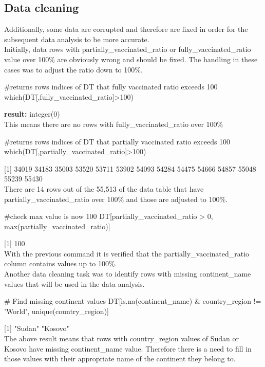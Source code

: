 \subsection{Data cleaning}
Additionally, some data are corrupted and therefore are fixed in order for the subsequent data analysis to be more accurate. \\
Initially, data rows with partially\_vaccinated\_ratio or fully\_vaccinated\_ratio value over 100\% are obviously wrong and should be fixed. The handling in these cases was to adjust the ratio down to 100\%. 

\begin{Rcode}{\scriptsize}
#returns rows indices of DT that fully vaccinated ratio exceeds 100%
which(DT[,fully_vaccinated_ratio]>100)
\end{Rcode}
\textbf{result:} integer(0)
\\
This means there are no rows with fully\_vaccinated\_ratio over 100\%

\begin{Rcode}{\scriptsize}
#returns rows indices of DT that partially vaccinated ratio exceeds 100
which(DT[,partially_vaccinated_ratio]>100)  
\end{Rcode}
[1] 34019 34183 35003 53520 53711 53902 54093 54284 54475 54666 54857 55048 55239 55430
\\
There are 14 rows out of the 55,513 of the data table that have partially\_vaccinated\_ratio over 100\% and those are adjusted to 100\%.

\begin{Rcode}{\scriptsize}
#check max value is now 100%
DT[partially_vaccinated_ratio > 0, max(partially_vaccinated_ratio)]
\end{Rcode}
[1] 100
\\
With the previous command it is verified that the partially\_vaccinated\_ratio column contains values up to 100\%.
\\
Another data cleaning task was to identify rows with missing continent\_name values that will be used in the data analysis.

\begin{Rcode}{\scriptsize}
# Find missing continent values
DT[is.na(continent_name) & country_region != 'World', unique(country_region)]
\end{Rcode}
[1] "Sudan"  "Kosovo"
\\
The above result means that rows with country\_region values of Sudan or Kosovo have missing continent\_name value. Therefore there is a need to fill in those values with their appropriate name of the continent they belong to.

